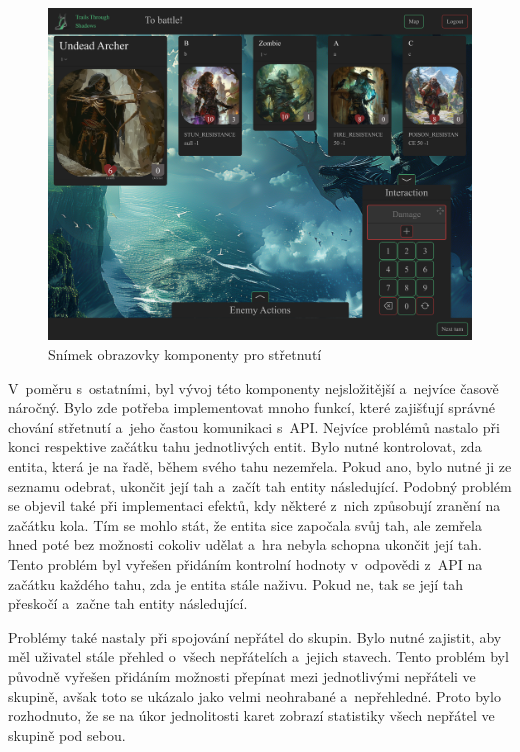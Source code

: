 \begin{figure}[H]
  \centering
  \includegraphics[width=.95\textwidth]{resources/figures/TTS-Encounter.png}
  \caption{Snímek obrazovky komponenty pro střetnutí}
  \label{fig:combat}
\end{figure}

V~poměru s~ostatními, byl vývoj této komponenty nejsložitější a~nejvíce časově náročný. Bylo zde potřeba implementovat mnoho funkcí, které zajišťují správné chování střetnutí a~jeho častou komunikaci s~API. Nejvíce problémů nastalo při konci respektive začátku tahu jednotlivých entit. Bylo nutné kontrolovat, zda entita, která je na řadě, během svého tahu nezemřela. Pokud ano, bylo nutné ji ze seznamu odebrat, ukončit její tah a~začít tah entity následující. Podobný problém se objevil také při implementaci efektů, kdy některé z~nich způsobují zranění na začátku kola. Tím se mohlo stát, že entita sice započala svůj tah, ale zemřela hned poté bez možnosti cokoliv udělat a~hra nebyla schopna ukončit její tah. Tento problém byl vyřešen přidáním kontrolní hodnoty v~odpovědi z~API na začátku každého tahu, zda je entita stále naživu. Pokud ne, tak se její tah přeskočí a~začne tah entity následující.

Problémy také nastaly při spojování nepřátel do skupin. Bylo nutné zajistit, aby měl uživatel stále přehled o~všech nepřátelích a~jejich stavech. Tento problém byl původně vyřešen přidáním možnosti přepínat mezi jednotlivými nepřáteli ve skupině, avšak toto se ukázalo jako velmi neohrabané a~nepřehledné. Proto bylo rozhodnuto, že se na úkor jednolitosti karet zobrazí statistiky všech nepřátel ve skupině pod sebou.

